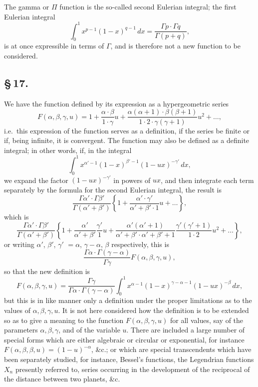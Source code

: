 \documentclass[11pt,a4paper]{book}
\begin{document}
The gamma or $\Pi$ function is the so-called second Eulerian integral; the first Eulerian integral
\[
\int_{0}^{1}x^{p-1}(1 - x)^{q-1}\,dx = \frac{\Gamma p \cdot \Gamma q}{\Gamma(p + q)},
\]
is at once expressible in terms of $\Gamma$, and is therefore not a new function to be considered.

\subsection*{\S\,17.}

We have the function defined by its expression as a hypergeometric series
\[
F(\alpha, \beta, \gamma, u) = 1 + \frac{\alpha \cdot \beta}{1 \cdot \gamma}u + \frac{\alpha(\alpha + 1) \cdot \beta(\beta + 1)}{1 \cdot 2 \cdot \gamma(\gamma + 1)}u^{2} + \ldots,
\]
i.e.\ this expression of the function serves as a definition, if the series be finite or if, being infinite, it is convergent. The function may also be defined as a definite integral; in other words, if, in the integral
\[
\int_{0}^{1}x^{\alpha' - 1}(1 - x)^{\beta' - 1}(1 - ux)^{-\gamma'}\,dx,
\]
we expand the factor $(1 - ux)^{-\gamma'}$ in powers of $ux$, and then integrate each term separately by the formula for the second Eulerian integral, the result is
\[
\frac{\Gamma\alpha' \cdot \Gamma\beta'}{\Gamma(\alpha' + \beta')}\left\{1 + \frac{\alpha' \cdot \gamma'}{\alpha' + \beta' \cdot 1}u + \ldots\right\},
\]
which is
\[
\frac{\Gamma\alpha' \cdot \Gamma\beta'}{\Gamma(\alpha' + \beta')}\left\{1 + \frac{\alpha'}{\alpha' + \beta'}\frac{\gamma'}{1}u + \frac{\alpha'(\alpha' + 1)}{\alpha' + \beta' \cdot \alpha' + \beta' + 1}\frac{\gamma'(\gamma' + 1)}{1 \cdot 2}u^{2} + \ldots\right\},
\]
or writing $\alpha'$, $\beta'$, $\gamma'$ $= \alpha$, $\gamma - \alpha$, $\beta$ respectively, this is
\[
\frac{\Gamma\alpha \cdot \Gamma(\gamma - \alpha)}{\Gamma\gamma}F(\alpha, \beta, \gamma, u),
\]
so that the new definition is
\[
F(\alpha, \beta, \gamma, u) = \frac{\Gamma\gamma}{\Gamma\alpha \cdot \Gamma(\gamma - \alpha)}\int_{0}^{1}x^{\alpha - 1}(1 - x)^{\gamma - \alpha - 1}(1 - ux)^{-\beta}\,dx,
\]
but this is in like manner only a definition under the proper limitations as to the values of $\alpha, \beta, \gamma, u$. It is not here considered how the definition is to be extended so as to give a meaning to the function $F(\alpha, \beta, \gamma, u)$ for all values, say of the parameters $\alpha, \beta, \gamma$, and of the variable $u$. There are included a large number of special forms which are either algebraic or circular or exponential, for instance $F(\alpha, \beta, \beta, u) = (1 - u)^{-\alpha}$, \&c.; or which are special transcendents which have been separately studied, for instance, Bessel's functions, the Legendrian functions $X_{n}$ presently referred to, series occurring in the development of the reciprocal of the distance between two planets, \&c.
\end{document}
